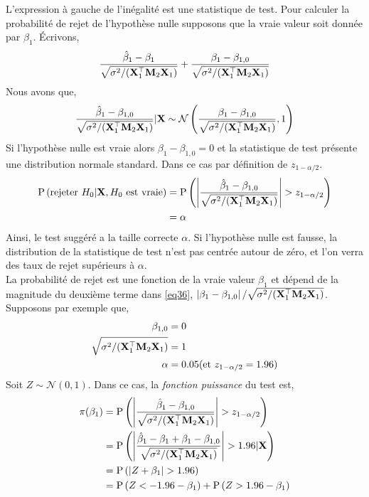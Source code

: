 L'expression à gauche de l'inégalité est une statistique de test. Pour calculer la probabilité de rejet de l'hypothèse nulle supposons que la vraie valeur soit donnée par $\beta_1$. \'Ecrivons, 
\begin{align}
\frac{\hat{\beta}_1 - \beta_1}{ \sqrt{\sigma^2/(\mathbf X_1^\top\mathbf M_2\mathbf X_1)}} + 
\frac{\beta_1 - \beta_{1,0}}{ \sqrt{\sigma^2/(\mathbf X_1^\top\mathbf M_2\mathbf X_1)}} 
\label{eq36}
\end{align}
Nous avons que,
\begin{align*}
\frac{\hat{\beta}_1 - \beta_{1,0}}{ \sqrt{\sigma^2/(\mathbf X_1^\top\mathbf M_2\mathbf X_1)}} | \mathbf X
 \sim
 \mathcal{N}\left( \frac{\beta_1 - \beta_{1,0}}{ \sqrt{\sigma^2/(\mathbf X_1^\top\mathbf M_2\mathbf X_1)}}, 1 \right) 
\end{align*}
Si l'hypothèse nulle est vraie alors $\beta_1-\beta_{1,0} = 0$ et la statistique de test présente une distribution normale standard. Dans ce cas par définition de $z_{1-\alpha/2}$.
\begin{align*}
\operatorname{P}\left(\textrm{rejeter} \ H_0 | \mathbf X, H_0 \ \textrm{est vraie}\right) &= 
\operatorname{P}\left(\left\vert {\frac{\hat{\beta}_1 - \beta_{1,0}}{ \sqrt{\sigma^2/(\mathbf X_1^\top\mathbf M_2\mathbf X_1)}}} \right\vert > z_{1-\alpha/2}\right)\\
&= \alpha
\end{align*}
Ainsi, le test suggéré a la taille correcte $\alpha$. Si l'hypothèse nulle est fausse, la distribution de la statistique de test n'est pas centrée autour de zéro, et l'on verra des taux de rejet supérieurs à $\alpha$.\\
La probabilité de rejet est une fonction de la vraie valeur $\beta_1$ et dépend de la magnitude du deuxième terme dans \eqref{eq36}, $\left\vert {\beta_1 - \beta_{1,0}} \right\vert/ \sqrt{\sigma^2/(\mathbf X_1^\top\mathbf M_2\mathbf X_1)}$. Supposons par exemple que,
\begin{align*}
\beta_{1,0} &= 0\\
 \sqrt{\sigma^2/(\mathbf X_1^\top\mathbf M_2\mathbf X_1)} &=1\\
 \alpha &=0.05(\textrm{et} \ z_{1-\alpha/2} = 1.96) 
\end{align*}
Soit $Z \sim \mathcal{N}(0,1)$. Dans ce cas, la \emph{fonction puissance} du test est,
\begin{align*}
\pi(\beta_1) &= \operatorname{P}\left( \left\vert {\frac{\hat{\beta}_1 - \beta_{1,0}}{ \sqrt{\sigma^2/(\mathbf X_1^\top\mathbf M_2\mathbf X_1)}}} \right\vert > z_{1-\alpha/2} \right)\\
&= \operatorname{P}\left( \left\vert {\frac{\hat{\beta}_1 - \beta_1+\beta_1 -\beta_{1,0}}{ \sqrt{\sigma^2/(\mathbf X_1^\top\mathbf M_2\mathbf X_1)}}} \right\vert > 1.96 | \mathbf X \right)\\
&=\operatorname{P}\left(\left\vert {Z + \beta_1} \right\vert > 1.96\right)\\
&= \operatorname{P}\left( Z < -1.96 - \beta_1\right)+ \operatorname{P}\left( Z > 1.96 - \beta_1\right)
\end{align*}
